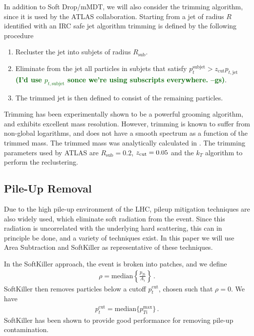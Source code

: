 \documentclass[11pt,letterpaper]{article}
\newcommand{\zcut}{z_{\rm cut}}
\newcommand{\gs}[1]{\textbf{\textcolor{darkgreen}{(#1 --gs)}}}
\begin{document}
In addition to Soft Drop/mMDT, we will also consider the trimming algorithm, since it is used by the ATLAS collaboration. Starting from a jet of radius $R$ identified with an IRC safe jet algorithm trimming is defined by the following procedure
\begin{enumerate}
\item Recluster the jet into subjets of radius $R_{\text{sub}}$.
\item Eliminate from the jet all particles in subjets that satisfy
  $p_t^{\text{subjet}} > z_{\text{cut}}p_{t,\text{jet}}$ \gs{I'd use
    $p_{t,\text{subjet}}$ sonce we're using subscripts everywhere.}.
\item The trimmed jet is then defined to consist of the remaining particles.
\end{enumerate}
Trimming has been experimentally shown to be a powerful grooming algorithm, and exhibits excellent mass resolution. However, trimming is known to suffer from non-global logarithms, and does not have a smooth spectrum as a function of the trimmed mass. The trimmed mass was analytically calculated in \cite{Dasgupta:2013ihk}. The trimming parameters used by ATLAS are $R_{\text{sub}}=0.2$,  $ \zcut=0.05$ and the $k_T$ algorithm to perform the reclustering.

\subsection{Pile-Up Removal}\label{sec:pu_tech}


Due to the high pile-up environment of the LHC, pileup mitigation techniques \cite{Cacciari:2007fd,Alon:2011xb,Soyez:2012hv,Tseng:2013dva,Krohn:2013lba,Cacciari:2014gra,Bertolini:2014bba} are also widely used, which eliminate soft radiation from the event. Since this radiation is uncorrelated with the underlying hard scattering, this can in principle be done, and a variety of techniques exist.  In this paper we will use Area Subtraction \cite{Cacciari:2007fd,Cacciari:2008gn} and SoftKiller \cite{Cacciari:2014gra} as representative of these techniques.

In the SoftKiller approach, the event is broken into patches, and we define
\begin{align}
\rho= \text{median} \left \{ \frac{p_{Ti}}{A_i}   \right \}\,.
\end{align}
SoftKiller then removes particles below a cutoff $p_t^{\text{cut}}$, chosen such that $\rho=0$. We have
\begin{align}
p_t^{\text{cut}}=\text{median} \{ p_{Ti}^{\text{max}} \}\,.
\end{align}
SoftKiller has been shown to provide good performance for removing pile-up contamination.
\end{document}
